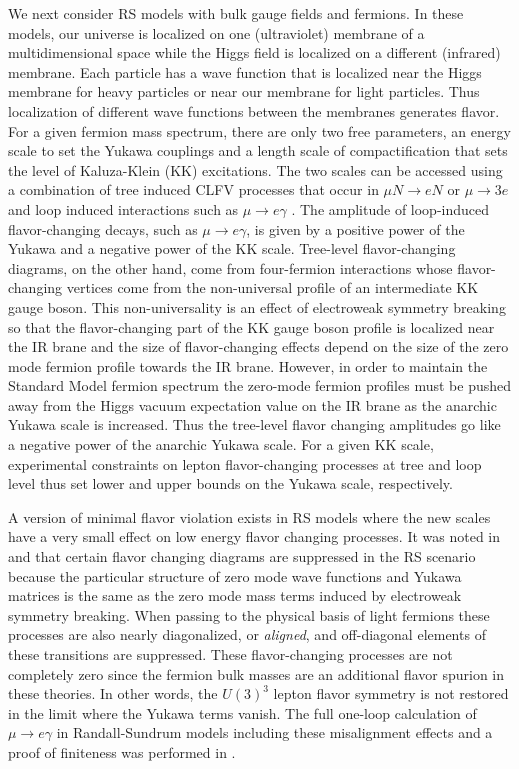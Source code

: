 We next consider RS models with
bulk gauge fields and fermions.   In these models, our universe
 is localized on one (ultraviolet) membrane of a multidimensional 
 space while the Higgs field is localized on a different (infrared) membrane. 
  Each particle has a wave function that is localized near the Higgs 
  membrane for heavy particles or near our membrane 
  for light particles. Thus localization of different wave functions between
   the membranes  generates flavor.
For a given fermion mass spectrum, there are only two free parameters,
 an energy scale to set the Yukawa couplings and a length scale of 
 compactification that sets the level of Kaluza-Klein  (KK) excitations.  The two scales can be accessed using a combination of tree induced CLFV processes that occur in $\mu N\rightarrow e N$ or $\mu\rightarrow 3e$ and loop induced interactions such as $\mu\rightarrow e\gamma$ \cite{hep-ph/0606021,arXiv:1004.2037}. The amplitude of loop-induced
flavor-changing decays, such as $\mu\to e \gamma$, is given by a
positive power of the Yukawa and a negative power of the KK
scale.  Tree-level flavor-changing diagrams, on the other hand, come
from four-fermion interactions whose flavor-changing vertices come
from the non-universal profile of an intermediate KK gauge boson. This
non-universality is an effect of electroweak symmetry breaking so that
the flavor-changing part of the KK gauge boson profile is localized
near the IR brane and the size of flavor-changing effects depend on
the size of the zero mode fermion profile towards the IR
brane. However, in order to maintain the Standard Model fermion
spectrum the zero-mode fermion profiles must be pushed away from the
Higgs vacuum expectation value on the IR brane as the anarchic Yukawa scale is
increased. Thus the tree-level flavor changing amplitudes go like a
negative power of the anarchic Yukawa scale. For a given KK scale,
experimental constraints on lepton flavor-changing processes at tree
and loop level thus set lower and upper bounds on the Yukawa scale,
respectively.

A version of minimal flavor violation exists in RS models where the new
 scales have a very small effect on low energy flavor changing processes.  
 It was noted in \cite{hep-ph/0606021} and \cite{Agashe:2004cp} that
certain flavor changing diagrams are suppressed in the RS scenario
because the particular structure of zero mode wave functions and
Yukawa matrices is the same as the zero mode mass terms induced by
electroweak symmetry breaking. When passing to the physical basis
of light fermions these processes are also nearly diagonalized, or
\textit{aligned}, and off-diagonal elements of these transitions are
suppressed. These flavor-changing processes are not completely zero 
since the fermion bulk masses are an additional flavor spurion
in these theories. In other words, the $U(3)^3$ lepton flavor 
symmetry is not restored in the limit where the Yukawa terms vanish. 
%
The full one-loop calculation of $\mu\to e \gamma$ in Randall-Sundrum
models including these misalignment effects and a proof of finiteness 
was performed in \cite{arXiv:1004.2037}.

